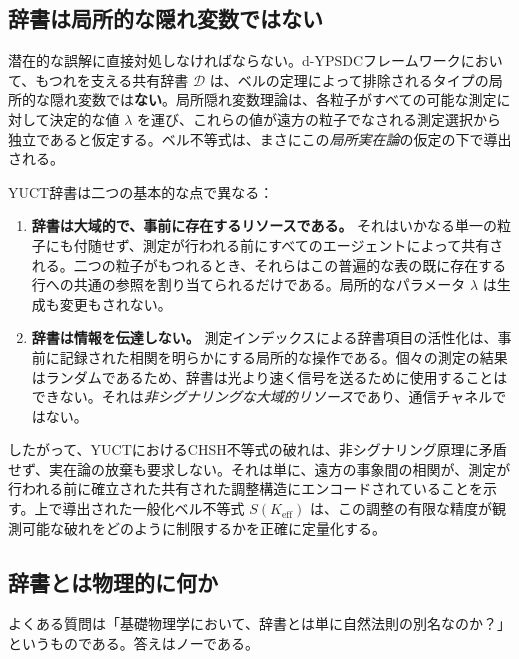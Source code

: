 \documentclass[12pt,a4paper]{article}
\theoremstyle{definition}
\theoremstyle{remark}
\begin{document}
	\subsection*{辞書は局所的な隠れ変数ではない}
	
	潜在的な誤解に直接対処しなければならない。d-YPSDCフレームワークにおいて、もつれを支える共有辞書 $\mathcal{D}$ は、ベルの定理によって排除されるタイプの局所的な隠れ変数では\textbf{ない}。局所隠れ変数理論は、各粒子がすべての可能な測定に対して決定的な値 $\lambda$ を運び、これらの値が遠方の粒子でなされる測定選択から独立であると仮定する。ベル不等式は、まさにこの\emph{局所実在論}の仮定の下で導出される。
	
	YUCT辞書は二つの基本的な点で異なる：
	
	\begin{enumerate}[leftmargin=*]
		\item \textbf{辞書は大域的で、事前に存在するリソースである。}
		それはいかなる単一の粒子にも付随せず、測定が行われる前にすべてのエージェントによって共有される。二つの粒子がもつれるとき、それらはこの普遍的な表の既に存在する行への共通の参照を割り当てられるだけである。局所的なパラメータ $\lambda$ は生成も変更もされない。
		
		\item \textbf{辞書は情報を伝達しない。}
		測定インデックスによる辞書項目の活性化は、事前に記録された相関を明らかにする局所的な操作である。個々の測定の結果はランダムであるため、辞書は光より速く信号を送るために使用することはできない。それは\emph{非シグナリングな大域的リソース}であり、通信チャネルではない。
	\end{enumerate}
	
	したがって、YUCTにおけるCHSH不等式の破れは、非シグナリング原理に矛盾せず、実在論の放棄も要求しない。それは単に、遠方の事象間の相関が、測定が行われる前に確立された共有された調整構造にエンコードされていることを示す。上で導出された一般化ベル不等式 $S(K_{\mathrm{eff}})$ は、この調整の有限な精度が観測可能な破れをどのように制限するかを正確に定量化する。
	
	\subsection*{辞書とは物理的に何か}
	
	よくある質問は「基礎物理学において、辞書とは単に自然法則の別名なのか？」というものである。答えはノーである。
	
\end{document}
